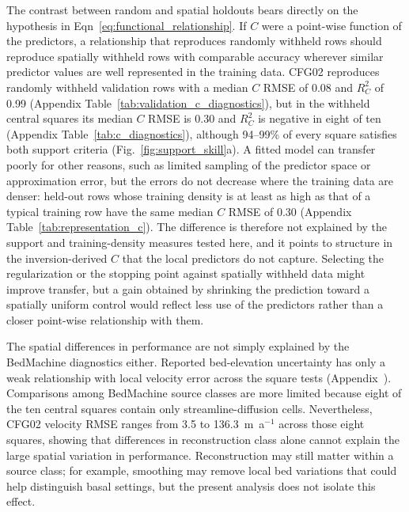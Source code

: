 \documentclass[review,jog]{igs}
\begin{document}
The contrast between random and spatial holdouts bears directly on the
hypothesis in Eqn~\ref{eq:functional_relationship}. If $C$ were a point-wise
function of the predictors, a relationship that reproduces randomly withheld
rows should reproduce spatially withheld rows with comparable accuracy wherever
similar predictor values are well represented in the training data. CFG02
reproduces randomly withheld validation rows with a median $C$ RMSE of 0.08 and
$R_C^2$ of 0.99 (Appendix Table~\ref{tab:validation_c_diagnostics}), but in the withheld
central squares its median $C$ RMSE is 0.30 and $R_C^2$ is negative in eight of
ten (Appendix Table~\ref{tab:c_diagnostics}), although 94--99\% of every square satisfies
both support criteria (Fig.~\ref{fig:support_skill}a). A fitted model can
transfer poorly for other reasons, such as limited sampling of the predictor
space or approximation error, but the errors do not decrease where the training
data are denser: held-out rows whose training density is at least as high as
that of a typical training row have the same median $C$ RMSE of
0.30 (Appendix Table~\ref{tab:representation_c}). The difference is therefore not
explained by the support and training-density measures tested here, and it points
to structure in the inversion-derived $C$ that the local predictors do not
capture. Selecting the regularization or the stopping point against spatially
withheld data might improve transfer, but a gain obtained by shrinking the
prediction toward a spatially uniform control would reflect less use of the
predictors rather than a closer point-wise relationship with them.

The spatial differences in performance are not simply explained by the
BedMachine diagnostics either. Reported bed-elevation uncertainty has
only a weak relationship with local velocity error across the square tests
(Appendix~). Comparisons among BedMachine
source classes are more limited because eight of the ten central squares
contain only streamline-diffusion cells. Nevertheless, CFG02 velocity RMSE
ranges from 3.5 to 136.3~m~a$^{-1}$ across those eight squares, showing that
differences in reconstruction class alone cannot explain the large spatial
variation in performance. Reconstruction may still matter within a source class; for example, smoothing may remove local bed variations that could help distinguish basal settings, but the present analysis does not isolate this effect.
\end{document}
